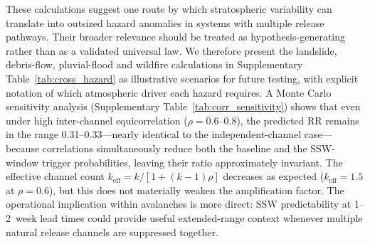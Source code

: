 \documentclass[11pt,letterpaper]{article}
\begin{document}
These calculations suggest one route by which stratospheric variability can translate into outsized hazard anomalies in systems with multiple release pathways. Their broader relevance should be treated as hypothesis-generating rather than as a validated universal law. We therefore present the landslide, debris-flow, pluvial-flood and wildfire calculations in Supplementary Table~\ref{tab:cross_hazard} as illustrative scenarios for future testing, with explicit notation of which atmospheric driver each hazard requires. A Monte Carlo sensitivity analysis (Supplementary Table~\ref{tab:corr_sensitivity}) shows that even under high inter-channel equicorrelation ($\rho = 0.6$--$0.8$), the predicted RR remains in the range 0.31--0.33---nearly identical to the independent-channel case---because correlations simultaneously reduce both the baseline and the SSW-window trigger probabilities, leaving their ratio approximately invariant. The effective channel count $k_{\mathrm{eff}} = k / [1 + (k-1)\rho]$ decreases as expected ($k_{\mathrm{eff}} = 1.5$ at $\rho = 0.6$), but this does not materially weaken the amplification factor. The operational implication within avalanches is more direct: SSW predictability at 1--2~week lead times\cite{Sigmond2013} could provide useful extended-range context whenever multiple natural release channels are suppressed together.
\end{document}
